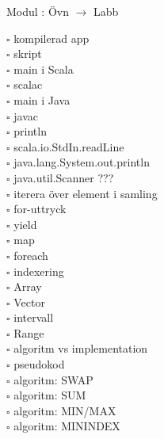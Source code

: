 
    Modul : Övn  $\rightarrow$ Labb \Alert{\texttt{--}}
    \begin{multicols}{3}\SlideFontTiny
    $\square$ kompilerad app \\
$\square$ skript \\
$\square$ main i Scala \\
$\square$ scalac \\
$\square$ main i Java \\
$\square$ javac \\
$\square$ println \\
$\square$ scala.io.StdIn.readLine \\
$\square$ java.lang.System.out.println \\
$\square$ java.util.Scanner ??? \\
$\square$ iterera över element i samling \\
$\square$ for-uttryck \\
$\square$ yield \\
$\square$ map \\
$\square$ foreach \\
$\square$ indexering \\
$\square$ Array \\
$\square$ Vector \\
$\square$ intervall \\
$\square$ Range \\
$\square$ algoritm vs implementation \\
$\square$ pseudokod \\
$\square$ algoritm: SWAP \\
$\square$ algoritm: SUM \\
$\square$ algoritm: MIN/MAX \\
$\square$ algoritm: MININDEX \\
    \end{multicols}
    